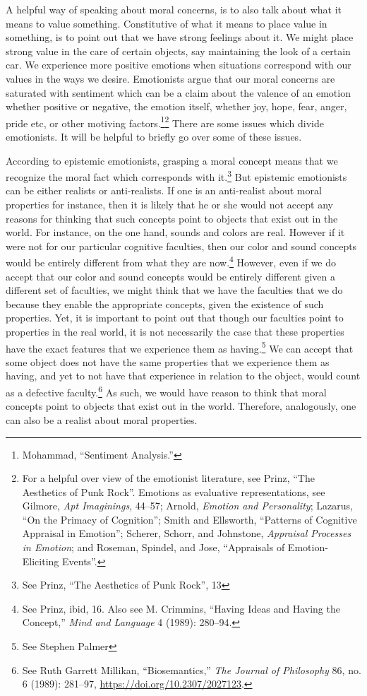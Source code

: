 \documentclass[phdthesis,12pt,final]{wuthesis}
\theoremstyle{definition}
\theoremstyle{definition}
\theoremstyle{definition}
\theoremstyle{definition}
\theoremstyle{remark}
\begin{document}
A helpful way of speaking about moral concerns, is to also talk about what it means to value something. Constitutive of what it means to place value in something, is to point out that we have strong feelings about it. We might place strong value in the care of certain objects, say maintaining the look of a certain car. We experience more positive emotions when situations correspond with our values in the ways we desire. Emotionists argue that our moral concerns are saturated with sentiment which can be a claim about the valence of an emotion whether positive or negative, the emotion itself, whether joy, hope, fear, anger, pride etc, or other motiving factors.\footnote{Mohammad, {``Sentiment {Analysis}.''}}\footnote{For a helpful over view of the emotionist literature, see Prinz, {``The {Aesthetics} of {Punk Rock}''}. Emotions as evaluative representations, see Gilmore, \emph{Apt {Imaginings}}, 44--57; Arnold, \emph{Emotion and {Personality}}; Lazarus, {``On the {Primacy} of {Cognition}''}; Smith and Ellsworth, {``Patterns of {Cognitive Appraisal} in {Emotion}''}; Scherer, Schorr, and Johnstone, \emph{Appraisal Processes in Emotion}; and Roseman, Spindel, and Jose, {``Appraisals of Emotion-Eliciting Events''}.} There are some issues which divide emotionists. It will be helpful to briefly go over some of these issues.

According to epistemic emotionists, grasping a moral concept means that we recognize the moral fact which corresponds with it.\footnote{See Prinz, {``The {Aesthetics} of {Punk Rock}''}, 13} But epistemic emotionists can be either realists or anti-realists. If one is an anti-realist about moral properties for instance, then it is likely that he or she would not accept any reasons for thinking that such concepts point to objects that exist out in the world. For instance, on the one hand, sounds and colors are real. However if it were not for our particular cognitive faculties, then our color and sound concepts would be entirely different from what they are now.\footnote{See Prinz, ibid, 16. Also see M. Crimmins, {``Having Ideas and Having the Concept,''} \emph{Mind and Language} 4 (1989): 280--94.} However, even if we do accept that our color and sound concepts would be entirely different given a different set of faculties, we might think that we have the faculties that we do because they enable the appropriate concepts, given the existence of such properties. Yet, it is important to point out that though our faculties point to properties in the real world, it is not necessarily the case that these properties have the exact features that we experience them as having.\footnote{See Stephen Palmer} We can accept that some object does not have the same properties that we experience them as having, and yet to not have that experience in relation to the object, would count as a defective faculty.\footnote{See Ruth Garrett Millikan, {``Biosemantics,''} \emph{The Journal of Philosophy} 86, no. 6 (1989): 281--97, \url{https://doi.org/10.2307/2027123}.} As such, we would have reason to think that moral concepts point to objects that exist out in the world. Therefore, analogously, one can also be a realist about moral properties.
\end{document}
